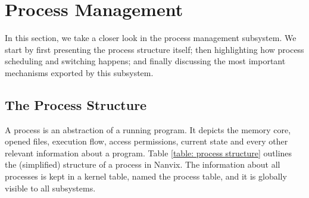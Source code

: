 \documentclass[10pt,a4paper]{article}
\begin{document}
\section{Process Management}

In this section, we take a closer look in the process management subsystem. We start by first presenting the process structure itself; then highlighting how process scheduling and switching happens; and finally discussing the most important mechanisms exported by this subsystem.

\subsection{The Process Structure}
\label{subsection: the process structure}

A process is an abstraction of a running program. It depicts the memory core, opened files, execution flow, access permissions, current state and every other relevant information about a program. Table \ref{table: process structure} outlines the (simplified) structure of a process in Nanvix. The information about all processes is kept in a kernel table, named the process table, and it is globally visible to all subsystems.
\end{document}
